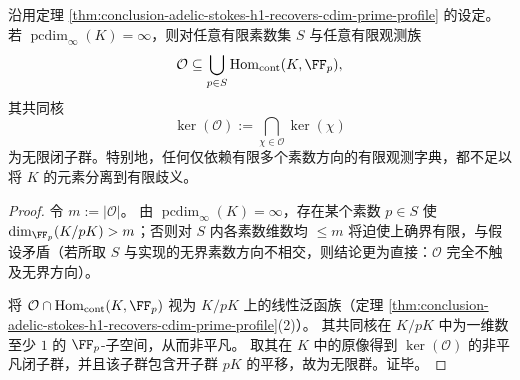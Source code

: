 \begin{corollary}[无界素数剖面下的有限观测不可辨识性]\label{cor:conclusion-unbounded-prime-profile-finite-observation-nonidentifiable}
沿用定理 \ref{thm:conclusion-adelic-stokes-h1-recovers-cdim-prime-profile} 的设定。
若 \(\operatorname{pcdim}_\infty(K)=\infty\)，则对任意有限素数集 \(S\) 与任意有限观测族
\[
\mathcal O\subseteq \bigcup_{p\in S}\mathrm{Hom}_{\mathrm{cont}}(K,\FF_p),
\]
其共同核
\[
\ker(\mathcal O):=\bigcap_{\chi\in\mathcal O}\ker(\chi)
\]
为无限闭子群。特别地，任何仅依赖有限多个素数方向的有限观测字典，都不足以将 \(K\) 的元素分离到有限歧义。
\end{corollary}
\begin{proof}
令 \(m:=|\mathcal O|\)。
由 \(\operatorname{pcdim}_\infty(K)=\infty\)，存在某个素数 \(p\in S\) 使 \(\dim_{\FF_p}(K/pK)>m\)；否则对 \(S\) 内各素数维数均 \(\le m\) 将迫使上确界有限，与假设矛盾（若所取 \(S\) 与实现的无界素数方向不相交，则结论更为直接：\(\mathcal O\) 完全不触及无界方向）。
\par
将 \(\mathcal O\cap \mathrm{Hom}_{\mathrm{cont}}(K,\FF_p)\) 视为 \(K/pK\) 上的线性泛函族（定理 \ref{thm:conclusion-adelic-stokes-h1-recovers-cdim-prime-profile}(2)）。
其共同核在 \(K/pK\) 中为一维数至少 \(1\) 的 \(\FF_p\)-子空间，从而非平凡。
取其在 \(K\) 中的原像得到 \(\ker(\mathcal O)\) 的非平凡闭子群，并且该子群包含开子群 \(pK\) 的平移，故为无限群。证毕。
\end{proof}

\endinput
